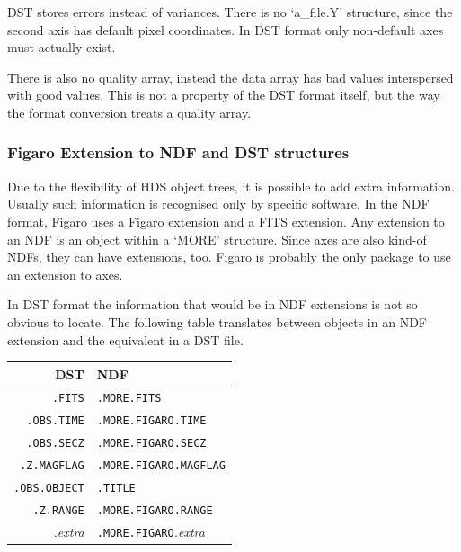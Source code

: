 \documentclass[11pt,twoside]{article}
\begin{document}
   DST stores errors instead of variances. There is no `a\_file.Y'
   structure, since the second axis has default pixel coordinates. In
   DST format only non-default axes must actually exist.

   There is also no quality array, instead the data array has bad values
   interspersed with good values. This is not a property of the DST
   format itself, but the way the format conversion treats a quality
   array.


\subsubsection{\label{filesextens}Figaro Extension to NDF and DST structures}

   Due to the flexibility of HDS object trees, it is possible to add
   extra information. Usually such information is recognised only by
   specific software. In the NDF format, Figaro uses a Figaro extension
   and a FITS extension. Any extension to an NDF is an object within a
   `MORE' structure. Since axes are also kind-of NDFs, they can have
   extensions, too. Figaro is probably the only package to use an
   extension to axes.

   In DST format the information that would be in NDF extensions is not
   so obvious to locate. The following table translates between objects
   in an NDF extension and the equivalent in a DST file.

\begin{center}
\begin{tabular}{rl}
DST & NDF \\ \hline
{\tt .FITS}       & {\tt .MORE.FITS} \\
{\tt .OBS.TIME}   & {\tt .MORE.FIGARO.TIME} \\
{\tt .OBS.SECZ}   & {\tt .MORE.FIGARO.SECZ} \\
{\tt .Z.MAGFLAG}  & {\tt .MORE.FIGARO.MAGFLAG} \\
{\tt .OBS.OBJECT} & {\tt .TITLE} \\
{\tt .Z.RANGE}    & {\tt .MORE.FIGARO.RANGE} \\
{\it .extra}      & {\tt .MORE.FIGARO}{\it .extra} \\
\end{tabular}
\end{center}

%
\end{document}
